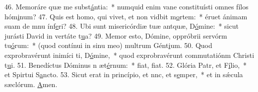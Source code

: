 46. Memoráre quæ me subst\uline{á}ntia:~* numquid enim vane constituísti omnes fílos hóm\uline{i}num?
47. Quis est homo, qui vivet, et non vidbit m\uline{o}rtem:~* éruet ánimam suam de mnu ínf\uline{e}ri?
48. Ubi sunt misericórdiæ tuæ antquæ, D\uline{ó}mine:~* sicut jurásti David in vertáte t\uline{u}a?
49. Memor esto, Dómine, oppróbrii servórm tu\uline{ó}rum:~* (quod contínui in sinu meo) multrum Gént\uline{i}um.
50. Quod exprobravérunt inimíci ti, D\uline{ó}mine,~* quod exprobravérunt commutatiónm Christi t\uline{u}i.
51. Benedíctus Dóminus n æt\uline{é}rnum:~* fiat, f\uline{i}at.
52. Glória Patr, et F\uline{í}lio,~* et Spirtui S\uline{a}ncto.
53. Sicut erat in princípio, et nnc, et s\uline{e}mper,~* et in sǽcula sæclórum. \uline{A}men.
